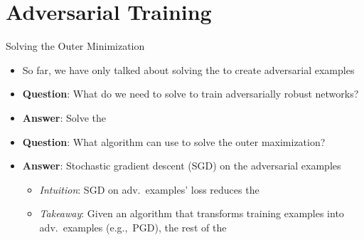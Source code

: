 \section{Adversarial Training}


\begin{frame}{Solving the Outer Minimization}

  \begin{itemize}[<+->]
    \item So far, we have only talked about solving the  to create adversarial examples

    \vspace{10pt}
    \item \textbf{Question}: What do we need to solve to train adversarially robust networks?
    \vspace{3pt}
    \item \textbf{Answer}: Solve the 

    \vspace{10pt}
    \item \textbf{Question}: What algorithm can use to solve the outer maximization?
    \vspace{3pt}
    \item \textbf{Answer}: Stochastic gradient descent (SGD) on the adversarial examples
      \begin{itemize}[<+->]
        \setlength{\itemsep}{4pt}
        \item \textit{Intuition}: SGD on adv.\ examples' loss reduces the 
        \item \textit{Takeaway}: Given an algorithm that transforms training examples into adv.\ examples (e.g.,~PGD), the rest of the \textbf{}
      \end{itemize}
  \end{itemize}
\end{frame}


